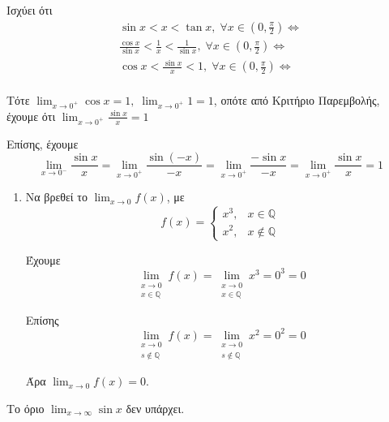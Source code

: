 \documentclass[a4paper,table]{report}
\begin{document}
\begin{prop}
  Ισχύει ότι 
  \begin{align*}
    \sin{x} < x < \tan{x}, \; \forall x \in \left(0, \frac{\pi}{2}\right) 
    \Leftrightarrow \\
    \frac{\cos{x}}{\sin{x}} < \frac{1}{x} < \frac{1}{\sin{x}}, \; \forall x \in 
    \left(0, \frac{\pi}{2}\right) \Leftrightarrow \\
    \cos{x} < \frac{\sin{x}}{x} < 1, \; \forall x \in \left(0, \frac{\pi}{2}\right) 
    \Leftrightarrow \\
  \end{align*} 

  Τότε $ \lim_{x \to 0^{+}} \cos{x} = 1, \; \lim_{x \to 0^{+}} 1 = 1 $, 
  οπότε από Κριτήριο Παρεμβολής, έχουμε ότι 
  $ \lim_{x \to 0^{+}} \frac{\sin{x}}{x} = 1$

  Επίσης, έχουμε
  \[
    \lim_{x \to 0^{-}} \frac{\sin{x}}{x} = \lim_{x \to 0^{+}} 
    \frac{\sin{(-x)}}{-x} = \lim_{x \to 0^{+}} \frac{- \sin{x}}{-x} = 
    \lim_{x \to 0^{+}} \frac{\sin{x}}{x} = 1 
  \] 
\end{prop}

\begin{examples}
\item {}
  \begin{enumerate}
    \item Να βρεθεί το $ \lim_{x \to 0} f(x) $, με 
      \[
        f(x) = 
        \begin{cases} 
          x^{3}, & x \in \mathbb{Q} \\
          x^{2}, & x\not \in \mathbb{Q} 
        \end{cases} 
      \] 

      Έχουμε 
      \[
        \lim_{\substack{x \to 0 \\ x \in \mathbb{Q}}} f(x) = 
        \lim_{\substack{x \to 0 \\ x \in \mathbb{Q}}} x^{3} = 0^{3} = 0 
      \] 

      Επίσης
      \[
        \lim_{\substack{x \to 0 \\ s \not \in \mathbb{Q}}} f(x) =  
        \lim_{\substack{x \to 0 \\ s \not \in \mathbb{Q}}} x^{2} = 0^{2} = 0
      \] 

      Άρα $ \lim_{x \to 0} f(x) = 0 $.

  \end{enumerate}
\end{examples}

\begin{prop}
  Το όριο $ \lim_{x \to \infty} \sin{x} $ δεν υπάρχει.
\end{prop}
\end{document}
